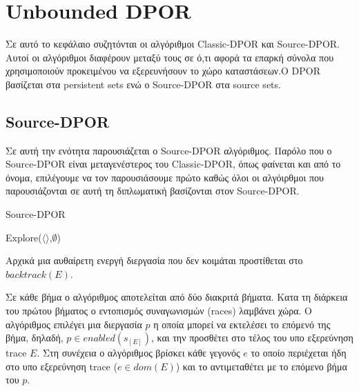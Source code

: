 \chapter{Unbounded DPOR}
\label{unbounded}

Σε αυτό το κεφάλαιο συζητόνται οι αλγόριθμοι Classic-DPOR και Source-DPOR. Αυτοί οι αλγόριθμοι διαφέρουν μεταξύ τους σε ό,τι αφορά τα επαρκή σύνολα που χρησιμοποιούν προκειμένου
να εξερευνήσουν το χώρο καταστάσεων.Ο DPOR βασίζεται στα persistent sets ενώ ο Source-DPOR στα source sets.    

\section{Source-DPOR}
Σε αυτή την ενότητα παρουσιάζεται ο Source-DPOR \cite{AbdullaAronisJohnssonSagonasDPOR2014} αλγόριθμος. Παρόλο που ο Source-DPOR είναι μεταγενέστερος του Classic-DPOR, όπως φαίνεται και 
από το όνομα, επιλέγουμε να τον παρουσιάσουμε πρώτο καθώς όλοι οι αλγόιρθμοι που παρουσιάζονται σε αυτή τη διπλωματική βασίζονται στον Source-DPOR.

\begin{algorithm}
    \caption{Source-DPOR}
    \label{Source}
    Explore($\langle \rangle$,$\emptyset$)\;
\end{algorithm}

\noindent Αρχικά μια αυθαίρετη ενεργή διεργασία που δεν κοιμάται προστίθεται στο $backtrack(E)$. 

Σε κάθε βήμα ο αλγόριθμος αποτελείται από δύο διακριτά βήματα.
Κατα τη διάρκεια του πρώτου βήματος ο εντοπισμός συναγωνισμών (races) λαμβάνει χώρα.
Ο αλγόριθμος επιλέγει μια διεργασία $p$ η οποία μπορεί να εκτελέσει το επόμενό της βήμα, δηλαδή, $p \in enabled(s_{[E]})$, και την προσθέτει στο τέλος του υπο εξερεύνηση trace $E$.
Στη συνέχεια ο αλγόριθμος βρίσκει κάθε γεγονός $e$ το οποίο περιέχεται ήδη στο υπο εξερεύνηση trace ($e \in dom(E)$) και το αντιμεταθέτει με το επόμενο βήμα του $p$.

